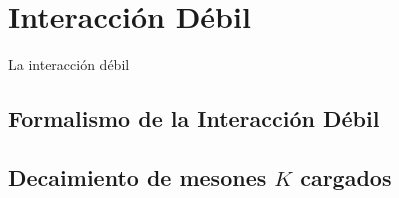 \chapter{Interacción Débil}\label{cap:weak_int}

La interacción débil


\section{Formalismo de la Interacción Débil}\label{cap:formalism}
\vspace{5mm}

\section{Decaimiento de mesones $K$ cargados}
\label{charged_kaon_decay}
\vspace{5mm}